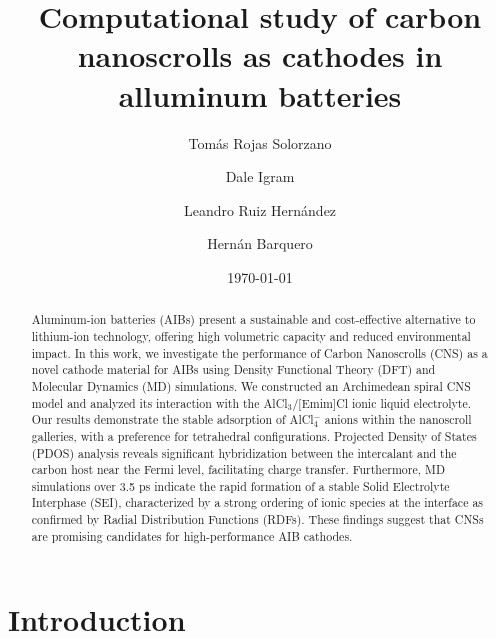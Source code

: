 \documentclass[aps,twocolumn,secnumarabic,nobalancelastpage,amsmath,amssymb,
nofootinbib,floatfix]{revtex4}
\begin{document}
\title			{Computational study of carbon nanoscrolls as cathodes in alluminum batteries}
\author         {Tomás Rojas Solorzano}
\author         {Dale Igram}
\author         {Leandro Ruiz Hernández}
\author         {Hernán Barquero}
\date{\today}


\begin{abstract}
Aluminum-ion batteries (AIBs) present a sustainable and cost-effective alternative to lithium-ion technology, offering high volumetric capacity and reduced environmental impact. In this work, we investigate the performance of Carbon Nanoscrolls (CNS) as a novel cathode material for AIBs using Density Functional Theory (DFT) and Molecular Dynamics (MD) simulations. We constructed an Archimedean spiral CNS model and analyzed its interaction with the AlCl$_3$/[Emim]Cl ionic liquid electrolyte. Our results demonstrate the stable adsorption of AlCl$_4^-$ anions within the nanoscroll galleries, with a preference for tetrahedral configurations. Projected Density of States (PDOS) analysis reveals significant hybridization between the intercalant and the carbon host near the Fermi level, facilitating charge transfer. Furthermore, MD simulations over 3.5 ps indicate the rapid formation of a stable Solid Electrolyte Interphase (SEI), characterized by a strong ordering of ionic species at the interface as confirmed by Radial Distribution Functions (RDFs). These findings suggest that CNSs are promising candidates for high-performance AIB cathodes.
\end{abstract}

\maketitle


\section{Introduction}
\end{document}
